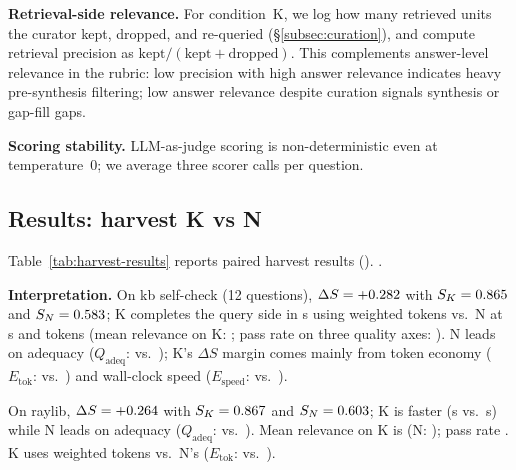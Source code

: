 \medskip
\noindent\textbf{Retrieval-side relevance.}  For condition~K, we log how many
retrieved units the curator kept, dropped, and re-queried (\S\ref{subsec:curation}),
and compute retrieval precision as $\text{kept}/(\text{kept}+\text{dropped})$.
This complements answer-level relevance in the rubric: low precision with high
answer relevance indicates heavy pre-synthesis filtering; low answer relevance
despite curation signals synthesis or gap-fill gaps.

\medskip
\noindent\textbf{Scoring stability.}  LLM-as-judge scoring is
non-deterministic even at temperature~0; we average three scorer calls per question.

\subsection{Results: harvest K vs N}
\label{subsec:results}

Table~\ref{tab:harvest-results} reports paired harvest results
(\ResultsUpdated{}).  \ResultsControlStatus{}.



\noindent\textbf{Interpretation.}  On kb self-check (12 questions),
$\Delta S = +0.282{}$ with $S_K = 0.865{}$ and $S_N = 0.583{}$;
K completes the query side in \KbSelfCheckKDurationSec{}s using \KbSelfCheckKTokens{}
weighted tokens vs.\ N at \KbSelfCheckNDurationSec{}s and \KbSelfCheckNTokens{} tokens
(mean relevance on K: \KbSelfCheckKRelevance{}; pass rate on three quality axes:
\KbSelfCheckKPass{}).
N leads on adequacy ($Q_{\text{adeq}}$: \KbSelfCheckNQadeq{} vs.\ \KbSelfCheckKQadeq{});
K's $\Delta S$ margin comes mainly from token economy ($E_{\text{tok}}$:
\KbSelfCheckKEtok{} vs.\ \KbSelfCheckNEtok{}) and wall-clock speed ($E_{\text{speed}}$:
\KbSelfCheckKEspeed{} vs.\ \KbSelfCheckNEspeed{}).

On raylib, $\Delta S = +0.264{}$ with $S_K = 0.867{}$ and
$S_N = 0.603{}$; K is faster (\RaylibKDurationSec{}s vs.\ \RaylibNDurationSec{}s) while N
leads on adequacy ($Q_{\text{adeq}}$: \RaylibNQadeq{} vs.\ \RaylibKQadeq{}).
Mean relevance on K is \RaylibKRelevance{} (N: \RaylibNRelevance{}); pass rate
\RaylibKPass{}.
K uses \RaylibKTokens{} weighted tokens vs.\ N's \RaylibNTokens{} ($E_{\text{tok}}$:
\RaylibKEtok{} vs.\ \RaylibNEtok{}).

